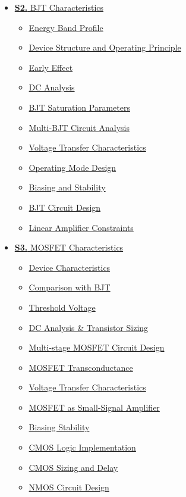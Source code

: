 \documentclass[12pt,a3paper]{article}
\begin{document}
\begin{tcolorbox}[breakable,colback=cA!5,colframe=cA,boxrule=1pt,arc=5pt,
  left=8pt,right=8pt,top=8pt,bottom=8pt,before skip=4pt]
\begin{itemize}[leftmargin=1.2em,itemsep=1pt,label={\textcolor{cA}{$\triangleright$}}]
    \item \hyperref[sec:S2]{\textbf{S2.} BJT Characteristics}
      \begin{itemize}[leftmargin=1.5em,itemsep=0pt,label={\textcolor{cA}{$\cdot$}}]
        \item \hyperref[sub:s2-energy]{Energy Band Profile}
        \item \hyperref[sub:s2-structure]{Device Structure and Operating Principle}
        \item \hyperref[sub:s2-early]{Early Effect}
        \item \hyperref[sub:s2-dc]{DC Analysis}
        \item \hyperref[sub:s2-saturation]{BJT Saturation Parameters}
        \item \hyperref[sub:s2-multibjtdc]{Multi-BJT Circuit Analysis}
        \item \hyperref[sub:s2-vtc]{Voltage Transfer Characteristics}
        \item \hyperref[sub:s2-opmode]{Operating Mode Design}
        \item \hyperref[sub:s2-biasing]{Biasing and Stability}
        \item \hyperref[sub:s2-design]{BJT Circuit Design}
        \item \hyperref[sub:s2-linear]{Linear Amplifier Constraints}
      \end{itemize}
    \item \hyperref[sec:S3]{\textbf{S3.} MOSFET Characteristics}
      \begin{itemize}[leftmargin=1.5em,itemsep=0pt,label={\textcolor{cA}{$\cdot$}}]
        \item \hyperref[sub:s3-devchar]{Device Characteristics}
        \item \hyperref[sub:s3-compare]{Comparison with BJT}
        \item \hyperref[sub:s3-threshold]{Threshold Voltage}
        \item \hyperref[sub:s3-dc]{DC Analysis \& Transistor Sizing}
        \item \hyperref[sub:s3-multistage]{Multi-stage MOSFET Circuit Design}
        \item \hyperref[sub:s3-gm]{MOSFET Transconductance}
        \item \hyperref[sub:s3-vtc]{Voltage Transfer Characteristics}
        \item \hyperref[sub:s3-ssa]{MOSFET as Small-Signal Amplifier}
        \item \hyperref[sub:s3-biasing]{Biasing Stability}
        \item \hyperref[sub:s3-cmos]{CMOS Logic Implementation}
        \item \hyperref[sub:s3-sizing]{CMOS Sizing and Delay}
        \item \hyperref[sub:s3-nmos]{NMOS Circuit Design}
      \end{itemize}
  \end{itemize}
\end{tcolorbox}
\end{document}
